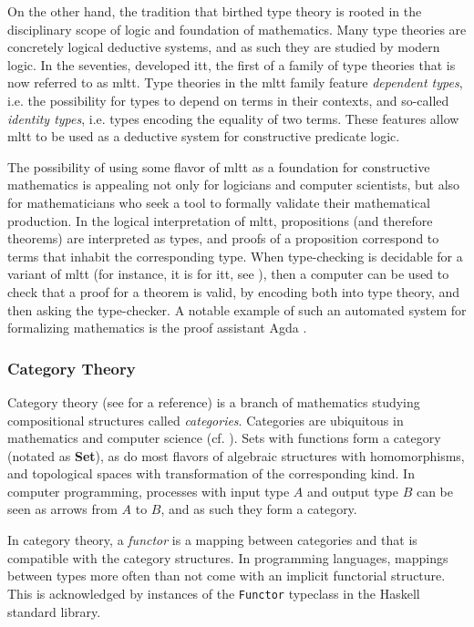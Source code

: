\documentclass[a4paper]{article}
\newcommand{\catname}[1]{{\normalfont\textbf{#1}}}
\newcommand{\Set}{\catname{Set}}
\begin{document}
On the other hand, the tradition that birthed type theory is rooted in the disciplinary scope of logic and foundation of mathematics. Many type theories are concretely logical deductive systems, and as such they are studied by modern logic. In the seventies, \textcite{MartinLoef1998} developed \gls{itt}, the first of a family of type theories that is now referred to as \gls{mltt}. Type theories in the \gls{mltt} family feature \textit{dependent types}, i.e. the possibility for types to depend on terms in their contexts, and so-called \textit{identity types}, i.e. types encoding the equality of two terms. These features allow \gls{mltt} to be used as a deductive system for constructive predicate logic.

The possibility of using some flavor of \gls{mltt} as a foundation for constructive mathematics is appealing not only for logicians and computer scientists, but also for mathematicians who seek a tool to formally validate their mathematical production. In the logical interpretation of \gls{mltt}, propositions (and therefore theorems) are interpreted as types, and proofs of a proposition correspond to terms that inhabit the corresponding type. When type-checking is decidable for a variant of \gls{mltt} (for instance, it is for \gls{itt}, see \textcite{Hofmann1995}), then a computer can be used to check that a proof for a theorem is valid, by encoding both into type theory, and then asking the type-checker. A notable example of such an automated system for formalizing mathematics is the proof assistant Agda \cite{Norell2009}.

\subsubsection{Category Theory}

Category theory (see \cite{Riehl2017} for a reference) is a branch of mathematics studying compositional structures called \textit{categories}. Categories are ubiquitous in mathematics and computer science (cf. \cite{Walters1992}). Sets with functions form a category (notated as \Set{}), as do most flavors of algebraic structures with homomorphisms, and topological spaces with transformation of the corresponding kind. In computer programming, processes with input type \(A\) and output type \(B\) can be seen as arrows from \(A\) to \(B\), and as such they form a category.

In category theory, a \textit{functor} is a mapping between categories and that is compatible with the category structures. In programming languages, mappings between types more often than not come with an implicit functorial structure. This is acknowledged by instances of the \texttt{Functor} typeclass in the Haskell standard library.
\end{document}
